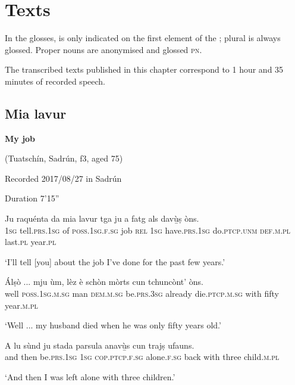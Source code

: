 \chapter{Texts}\label{sec:8}
In the glosses,  is only indicated on the first element of the ; plural is always glossed. Proper nouns are anonymised and glossed \textsc{pn}.

The transcribed texts published in this chapter correspond to 1 hour and 35 minutes of recorded speech.

\section{Mia lavur}\label{sec:8.1}

\noindent
\textbf{My job}

\noindent
(Tuatschín, Sadrún, f3, aged 75)

\noindent
Recorded  2017/08/27 in Sadrún

\noindent
Duration 7'15''
\bigskip

\begin{linenumbers}
\gll   Ju raquénta da mia lavur tga ju a fatg als davù̱ṣ òns. \\
 \textsc{1sg} tell.\textsc{prs.1sg} of \textsc{poss.1sg.f.sg} job \textsc{rel} \textsc{1sg}  have.\textsc{prs.1sg} do.\textsc{ptcp.unm} \textsc{def.m.pl} last.\textsc{pl} year.\textsc{pl}\\
\end{linenumbers}
\medskip
\glt `I’ll tell [you] about the job I've done for the past few years.'
\medskip

\begin{linenumbers}
\gll  Álṣò ... mju ùm, lèz è schòn mòrts cun tchuncònt’ òns.  \\
well {} \textsc{poss.1sg.m.sg} man \textsc{dem.m.sg} be.\textsc{prs.3sg} already die.\textsc{ptcp.m.sg}  with fifty year.\textsc{m.pl} \\
\end{linenumbers}
\medskip
\glt `Well ... my husband died when he was only fifty years old.'
\medskip

\begin{linenumbers}
\gll A lu sùnd ju stada parsula anavù̱s cun trajṣ ufauns.   \\
and then be.\textsc{prs.1sg} \textsc{1sg} \textsc{cop.ptcp.f.sg} alone.\textsc{f.sg} back with three child.\textsc{m.pl}  \\
\end{linenumbers}
\medskip
\glt `And then I was left alone with three children.'
\medskip

